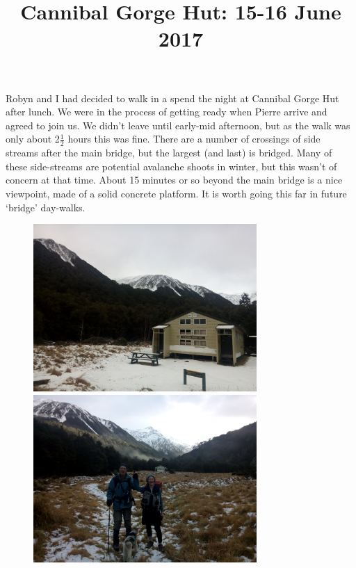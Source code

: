 \documentclass[12pt]{article} %
\title{Cannibal Gorge Hut: 15-16 June 2017}
\makeatletter
\renewcommand{\maketitle}{%
  {\bfseries{\scshape{\Large{\@title\par}}}}
}
\makeatother
\begin{document}
  \maketitle

Robyn and I had decided to walk in a spend the night at Cannibal Gorge Hut after lunch.  We were in the process of getting ready when Pierre arrive and agreed to join us.  We didn't leave until early-mid afternoon, but as the walk was only about 2$\frac{1}{2}$ hours this was fine.  There are a number of crossings of side streams after the main bridge, but the largest (and last) is bridged.  Many of these side-streams are potential avalanche shoots in winter, but this wasn't of concern at that time.  About 15 minutes or so beyond the main bridge is a nice viewpoint, made of a solid concrete platform.  It is worth going this far in future `bridge' day-walks.

\begin{figure}[ht]
\begin{minipage}{.5\linewidth}
\begin{flushleft}
   \includegraphics[width=8.5cm]{CannibalGorgeHut15June2017Photo1}
\end{flushleft}
\end{minipage}
\begin{minipage}{.5\linewidth}
\begin{flushright}
    \includegraphics[width=8.5cm]{CannibalGorgeHut15June2017Photo2}
\end{flushright}
\end{minipage}
\end{figure}
\end{document}
